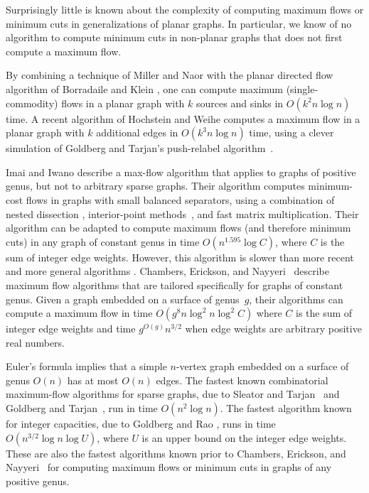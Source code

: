 Surprisingly little is known about the complexity of computing maximum flows or minimum cuts in generalizations of planar graphs.  In particular, we know of no algorithm to compute minimum cuts in non-planar graphs that does not first compute a maximum flow.

By combining a technique of Miller and Naor \cite{mn-fpgms-95} with the planar directed flow algorithm of Borradaile and Klein \cite{b-epnfc-08, bk-tamfd-06, bk-amfdp-09}, one can compute maximum (single-commodity) flows in a planar graph with $k$ sources and sinks in $O(k^2 n\log n)$ time.  A recent algorithm of Hochstein and Weihe \cite{hw-mstfkc-07} computes a maximum flow in a planar graph with $k$ additional edges in $O(k^3n\log n)$ time, using a clever simulation of Goldberg and Tarjan's push-relabel algorithm~\cite{gt-namfp-88}.

Imai and Iwano \cite{ii-espap-90} describe a max-flow algorithm that applies to graphs of positive genus, but not to arbitrary sparse graphs.
Their algorithm computes minimum-cost flows in graphs with small balanced separators, using a combination of nested dissection \cite{lrt-gnd-79, pr-fepss-93}, interior-point methods~\cite{v-slpfm-89}, and fast matrix multiplication.
Their algorithm can be adapted to compute maximum flows (and therefore minimum cuts) in any graph of constant genus in time $O(n^{1.595}\log C)$, where $C$ is the sum of integer edge weights.
However, this algorithm is slower than more recent and more general algorithms \cite{gr-bfdb-98}.
Chambers, Erickson, and Nayyeri~\cite{cen-hfcc-12} describe maximum flow algorithms that are tailored specifically for graphs of constant genus.
Given a graph embedded on a surface of genus~$g$, their algorithms can compute a maximum flow in time $O(g^8 n \log^2 n \log^2 C)$ where $C$ is the sum of integer edge weights and time $g^{O(g)}n^{3/2}$ when edge weights are arbitrary positive real numbers.

Euler's formula implies that a simple $n$-vertex graph embedded on a surface of genus $O(n)$ has at most $O(n)$ edges.  The fastest known combinatorial maximum-flow algorithms for sparse graphs, due to Sleator and Tarjan~\cite{st-dsdt-83} and Goldberg and Tarjan~\cite{gt-namfp-88}, run in time $O(n^2\log n)$.  The fastest algorithm known for integer capacities, due to Goldberg and Rao \cite{gr-bfdb-98}, runs in time $O(n^{3/2}\log n\log U)$, where $U$ is an upper bound on the integer edge weights.  These are also the fastest algorithms known prior to Chambers, Erickson, and Nayyeri~\cite{cen-hfcc-12} for computing maximum flows or minimum cuts in graphs of any positive genus.

